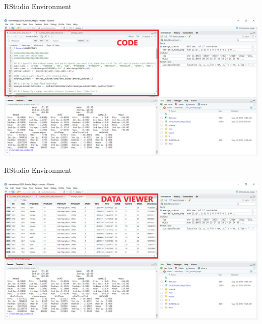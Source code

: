 \documentclass[ignorenonframetext,]{beamer}
\begin{document}
\begin{frame}{RStudio Environment}
\protect\hypertarget{rstudio-environment-4}{}

\includegraphics{../external/images/rstudio_terminal_4_CODE.png}

\end{frame}

\begin{frame}{RStudio Environment}
\protect\hypertarget{rstudio-environment-5}{}

\includegraphics{../external/images/rstudio_terminal_5_DATA.png}

\end{frame}
\end{document}
